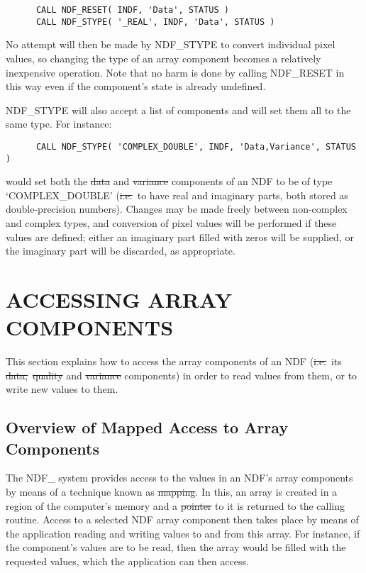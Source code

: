 \small
\begin{verbatim}
      CALL NDF_RESET( INDF, 'Data', STATUS )
      CALL NDF_STYPE( '_REAL', INDF, 'Data', STATUS )
\end{verbatim}      
\normalsize

No attempt will then be made by NDF\_STYPE to convert individual pixel values,
so changing the type of an array component becomes a relatively inexpensive
operation.
Note that no harm is done by calling NDF\_RESET in this way even if the
component's state is already undefined. 

NDF\_STYPE will also accept a list of components and will set them all to 
the same type.
For instance:

\small
\begin{verbatim}
      CALL NDF_STYPE( 'COMPLEX_DOUBLE', INDF, 'Data,Variance', STATUS )
\end{verbatim}
\normalsize

would set both the \st{data\/} and \st{variance\/} components of an NDF to be
of type `COMPLEX\_DOUBLE' (\st{i.e.}\ to have real and imaginary parts, both
stored as double-precision numbers). 
Changes may be made freely between non-complex and complex types, and
conversion of pixel values will be performed if these values are defined;
either an imaginary part filled with zeros will be supplied, or the
imaginary part will be discarded, as appropriate. 


\section{\label{ss:accessingarraycomponents}ACCESSING ARRAY COMPONENTS}

This section explains how to access the array components of an NDF
(\st{i.e.}\ its \st{data,}\ \st{quality\/} and \st{variance\/}
components) in  
order to read values from them, or to write new values to them.

\subsection{Overview of Mapped Access to Array Components}

The NDF\_ system provides access to the values in an NDF's array
components by means of a technique known as \st{mapping}.  In this,
an array is created in a region of the computer's memory and a
\st{pointer\/} to it is returned to the calling routine.  Access to a 
selected NDF array component then takes place by means of the
application reading and writing values to and from this array.  For
instance, if the component's values are to be read, then the array
would be filled with the requested values, which the application can
then access.

